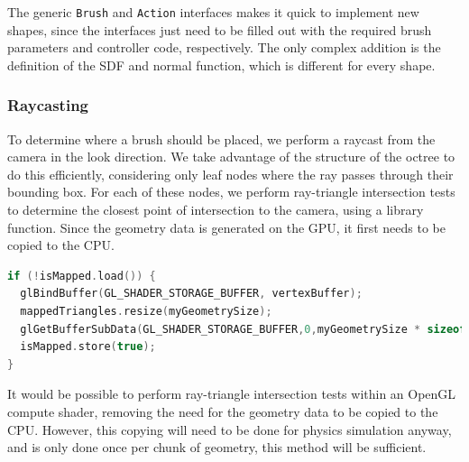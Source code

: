 \documentclass[11pt]{article}
\begin{document}
The generic \texttt{Brush} and \texttt{Action} interfaces makes it quick to implement new shapes, since the interfaces just need to be filled out with the required brush parameters and controller code, respectively. The only complex addition is the definition of the SDF and normal function, which is different for every shape.

\subsubsection{Raycasting}
\label{section:raycasting}
To determine where a brush should be placed, we perform a raycast from the camera in the look direction. We take advantage of the structure of the octree to do this efficiently, considering only leaf nodes where the ray passes through their bounding box. For each of these nodes, we perform ray-triangle intersection tests to determine the closest point of intersection to the camera, using a library function. Since the geometry data is generated on the GPU, it first needs to be copied to the CPU.

\begin{lstlisting}[language=C++,label={mapgeometry},caption={Snippet from the procedure \texttt{mapGeometry} to copy geometry data for a chunk from the GPU to the array \texttt{mappedTriangles}. \texttt{isMapped} is an atomic boolean storing whether \texttt{mapGeometry} has already been called for this chunk.}]
if (!isMapped.load()) {
  glBindBuffer(GL_SHADER_STORAGE_BUFFER, vertexBuffer);
  mappedTriangles.resize(myGeometrySize);
  glGetBufferSubData(GL_SHADER_STORAGE_BUFFER,0,myGeometrySize * sizeof(glm::vec4),mappedTriangles.data());
  isMapped.store(true);
}
\end{lstlisting}

It would be possible to perform ray-triangle intersection tests within an OpenGL compute shader, removing the need for the geometry data to be copied to the CPU. However, this copying will need to be done for physics simulation anyway, and is only done once per chunk of geometry, this method will be sufficient.
\end{document}
